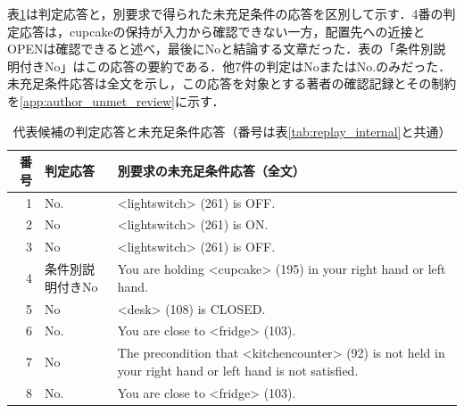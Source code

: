 表\ref{tab:unmet_internal}は判定応答と，別要求で得られた未充足条件の応答を区別して示す．4番の判定応答は，cupcakeの保持が入力から確認できない一方，配置先への近接とOPENは確認できると述べ，最後にNoと結論する文章だった．表の「条件別説明付きNo」はこの応答の要約である．他7件の判定はNoまたはNo.のみだった．未充足条件応答は全文を示し，この応答を対象とする著者の確認記録とその制約を\ref{app:author_unmet_review}に示す．
\begin{table}[tb]
\caption{代表候補の判定応答と未充足条件応答（番号は表\ref{tab:replay_internal}と共通）}\label{tab:unmet_internal}
\centering\small
\setlength{\tabcolsep}{3pt}
\begin{tabular}{rp{}p{}}
\hline
番号 & 判定応答 & 別要求の未充足条件応答（全文） \\
\hline
1 & No. & \textless{}lightswitch\textgreater{} (261) is OFF. \\
2 & No & \textless{}lightswitch\textgreater{} (261) is ON. \\
3 & No & \textless{}lightswitch\textgreater{} (261) is OFF. \\
4 & 条件別説明付きNo & You are holding \textless{}cupcake\textgreater{} (195) in your right hand or left hand. \\
5 & No & \textless{}desk\textgreater{} (108) is CLOSED. \\
6 & No. & You are close to \textless{}fridge\textgreater{} (103). \\
7 & No & The precondition that \textless{}kitchencounter\textgreater{} (92) is not held in your right hand or left hand is not satisfied. \\
8 & No. & You are close to \textless{}fridge\textgreater{} (103). \\
\hline
\end{tabular}
\end{table}


